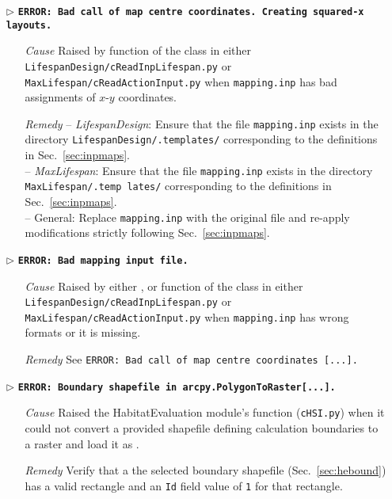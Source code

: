 \begin{itemize}
	\item[$\triangleright$]\textbf{\texttt{ERROR: Bad call of map centre coordinates. Creating squared-x layouts.}}
	\begin{itemize}
		\item[\textit{Cause}\hspace{0.27cm}] Raised by  function of the  class in either \texttt{LifespanDesign/cReadInpLifespan.py} or \texttt{MaxLifespan/cReadActionInput.py} when \texttt{mapping.inp} has bad assignments of $x$-$y$ coordinates.
		\item[\textit{Remedy}] -- \textit{LifespanDesign}: Ensure that the file \texttt{mapping.inp} exists in the directory \texttt{LifespanDesign/.templates/} corresponding to the definitions in Sec.~\ref{sec:inpmaps}.\\
													 -- \textit{MaxLifespan}: Ensure that the file \texttt{mapping.inp} exists in the directory \texttt{MaxLifespan/.temp lates/} corresponding to the definitions in Sec.~\ref{sec:inpmaps}.\\
													 -- General: Replace \texttt{mapping.inp} with the original file and re-apply modifications strictly following Sec.~\ref{sec:inpmaps}.
	\end{itemize}
	
	\item[$\triangleright$]\textbf{\texttt{ERROR: Bad mapping input file.}}
	\begin{itemize}
		\item[\textit{Cause}\hspace{0.27cm}] Raised by either ,  or  function of the  class in either \texttt{LifespanDesign/cReadInpLifespan.py} or \texttt{MaxLifespan/cReadActionInput.py} when \texttt{mapping.inp} has wrong formats or it is missing.
		\item[\textit{Remedy}] See \texttt{ERROR: Bad call of map centre coordinates [...].}\\
	\end{itemize}
	
	\item[$\triangleright$]\textbf{\texttt{ERROR: Boundary shapefile in arcpy.PolygonToRaster[...].}}
	\begin{itemize}
		\item[\textit{Cause}\hspace{0.27cm}] Raised the HabitatEvaluation module's  function (\texttt{cHSI.py}) when it could not convert a provided shapefile defining calculation boundaries to a raster and load it as .
		\item[\textit{Remedy}] Verify that a the selected boundary shapefile (Sec.~\ref{sec:hebound}) has a valid rectangle and an \texttt{Id} field value of \texttt{1} for that rectangle.\\
	\end{itemize}
	

\end{itemize}

